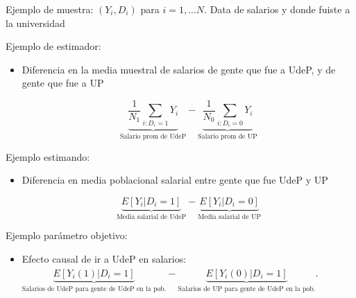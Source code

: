 \documentclass[11pt,handout,aspectratio=169]{beamer}
\newenvironment{wideitemizeshort}{\itemize}{\enditemize}
\begin{document}
\begin{frame}
\begin{wideitemizeshort}
	\item
	Ejemplo de muestra: $(Y_i,D_i)$ para $i=1,...N$. Data de salarios y donde fuiste a la universidad
	
	\pause 
	
	\item
	Ejemplo de estimador: 
		\begin{itemize}
			\item
			Diferencia en la media muestral de salarios de gente que fue a UdeP, y de gente que fue a UP
			
			$$ \underbrace{\frac{1}{N_1} \sum_{i:D_i=1} Y_i}_{\text{Salario prom de UdeP}} - \underbrace{\frac{1}{N_0} \sum_{i:D_i=0} Y_i}_{\text{Salario prom de UP}}$$		
		\end{itemize}
	
	\pause
		\item
		Ejemplo estimando: 	
		
				\begin{itemize}
			\item
			Diferencia en media poblacional salarial entre gente que fue UdeP y UP 
			
			$$\underbrace{ E[ Y_i | D_i = 1] }_{\text{Media salarial de UdeP}} - \underbrace{E[Y_i | D_i = 0]}_{\text{Media salarial de UP}}$$
		 
		\end{itemize}
	\pause 
	
	\item
	Ejemplo parámetro objetivo:
		\begin{itemize}
			\item Efecto causal de ir a UdeP en salarios:
			$\underbrace{E[Y_i(1) | D_i =1]}_{\text{Salarios de UdeP para gente de UdeP en la pob.}} - \underbrace{E[Y_i(0) | D_i = 1]}_{\text{Salarios de UP para gente de UdeP en la pob.}} $.   
		\end{itemize}
\end{wideitemizeshort}
\end{frame}
\end{document}
